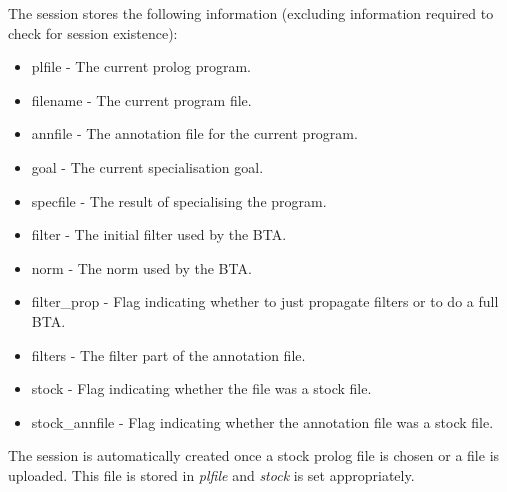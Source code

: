 \documentclass{report}
\begin{document}
The session stores the following information (excluding information required
to check for session existence):
\begin{itemize}
\item plfile - The current prolog program.
\item filename - The current program file.
\item annfile - The annotation file for the current program.
\item goal - The current specialisation goal.
\item specfile - The result of specialising the program.
\item filter - The initial filter used by the BTA.
\item norm - The norm used by the BTA.
\item filter\_prop - Flag indicating whether to just propagate filters or to
do a full BTA.
\item filters - The filter part of the annotation file.
\item stock - Flag indicating whether the file was a stock file.
\item stock\_annfile - Flag indicating whether the annotation file was a stock
file.
\end{itemize}

The session is automatically created once a stock prolog file is chosen or a
file is uploaded. This file is stored in \emph{plfile} and \emph{stock} is
set appropriately. 
\end{document}
